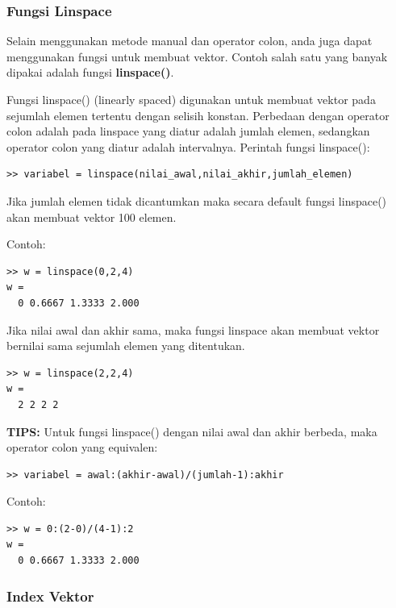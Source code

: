 \documentclass[12pt]{book}
\begin{document}
	\subsubsection{Fungsi Linspace}

	Selain menggunakan metode manual dan operator colon, anda juga dapat menggunakan fungsi untuk membuat vektor.
	Contoh salah satu yang banyak dipakai adalah fungsi \textbf{linspace()}.
	
	Fungsi linspace() (linearly spaced) digunakan untuk membuat vektor pada sejumlah elemen tertentu dengan selisih konstan.
	Perbedaan dengan operator colon adalah pada linspace yang diatur adalah jumlah elemen, sedangkan operator colon yang diatur adalah intervalnya.
	Perintah fungsi linspace():
	\begin{verbatim}
>> variabel = linspace(nilai_awal,nilai_akhir,jumlah_elemen)
	\end{verbatim}
		
	Jika jumlah elemen tidak dicantumkan maka secara default fungsi linspace() akan membuat vektor 100 elemen.
	
	Contoh:
	\begin{verbatim}
>> w = linspace(0,2,4)
w = 
  0 0.6667 1.3333 2.000
	\end{verbatim}

	Jika nilai awal dan akhir sama, maka fungsi linspace akan membuat vektor bernilai sama sejumlah elemen yang ditentukan.
	\begin{verbatim}
>> w = linspace(2,2,4)
w = 
  2 2 2 2
	\end{verbatim}

	\textbf{TIPS:} Untuk fungsi linspace() dengan nilai awal dan akhir berbeda, maka operator colon yang equivalen:
	\begin{verbatim}
>> variabel = awal:(akhir-awal)/(jumlah-1):akhir 
	\end{verbatim}

	\newpage
	Contoh:
	\begin{verbatim}
>> w = 0:(2-0)/(4-1):2
w = 
  0 0.6667 1.3333 2.000
	\end{verbatim}

	\subsubsection{Index Vektor}
	
\end{document}
